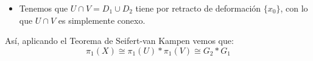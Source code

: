 \documentclass[12pt]{article}
\begin{document}
\begin{ejercicio}
\begin{enumerate}[label=\alph*)]
\begin{itemize}
                        \begin{equation*}
                            \pi_1(V) \cong \pi_1(S_1) \cong G_1
                        \end{equation*}
                    \item Tenemos que $U\cap V = D_1\cup D_2$ tiene por retracto de deformación $\{x_0\}$, con lo que $U\cap V$ es simplemente conexo.
                \end{itemize}
                Así, aplicando el Teorema de Seifert-van Kampen vemos que:
                \begin{equation*}
                    \pi_1(X) \cong \pi_1(U)\ast \pi_1(V) \cong G_2\ast G_1
                \end{equation*}
        \end{enumerate}
    \end{ejercicio}
\end{document}
